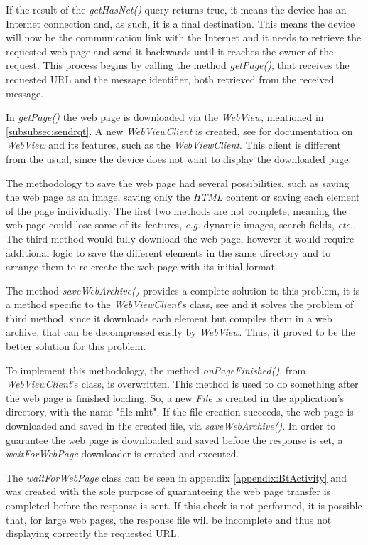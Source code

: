 If the result of the \textit{getHasNet()} query returns true, it means the device has an Internet connection and, as such, it is a final destination. This means the device will now be the communication link with the Internet and it needs to retrieve the requested web page and send it backwards until it reaches the owner of the request. This process begins by calling the method \textit{getPage()}, that receives the requested \gls{URL} and the message identifier, both retrieved from the received message.

In \textit{getPage()} the web page is downloaded via the \textit{WebView}, mentioned in \ref{subsubsec:sendrqt}. A new \textit{WebViewClient} is created, see \cite{webview} for documentation on \textit{WebView} and its features, such as the \textit{WebViewClient}. This client is different from the usual, since the device does not want to display the downloaded page.

The methodology to save the web page had several possibilities, such as saving the web page as an image, saving only the \textit{HTML} content or saving each element of the page individually. The first two methods are not complete, meaning the web page could lose some of its features, \textit{e.g.} dynamic images, search fields, \textit{etc.}. The third method would fully download the web page, however it would require additional logic to save the different elements in the same directory and to arrange them to re-create the web page with its initial format.

The method \textit{saveWebArchive()} provides a complete solution to this problem, it is a method specific to the \textit{WebViewClient}'s class, see \cite{webview} and it solves the problem of third method, since it downloads each element but compiles them in a web archive, that can be decompressed easily by \textit{WebView}. Thus, it proved to be the better solution for this problem.

To implement this methodology, the method \textit{onPageFinished()}, from \textit{WebViewClient}'s class, is overwritten. This method is used to do something after the web page is finished loading. So, a new \textit{File} is created in the application's directory, with the name "file.mht". If the file creation succeeds, the web page is downloaded and saved in the created file, via \textit{saveWebArchive()}. In order to guarantee the web page is downloaded and saved before the response is set, a \textit{waitForWebPage} downloader is created and executed.

The \textit{waitForWebPage} class can be seen in appendix \ref{appendix:BtActivity} and was created with the sole purpose of guaranteeing the web page transfer is completed before the response is sent. If this check is not performed, it is possible that, for large web pages, the response file will be incomplete and thus not displaying correctly the requested \gls{URL}.

